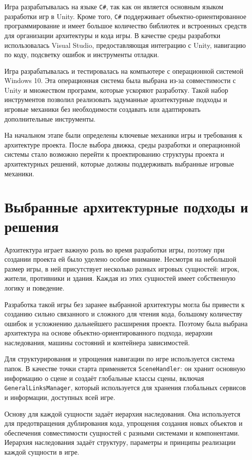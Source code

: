\documentclass[a4paper,12pt]{report}
\begin{document}
Игра разрабатывалась на языке \texttt{C\#}, так как он является основным языком разработки игр в Unity. Кроме того, \texttt{C\#} поддерживает объектно-ориентированное программирование и имеет большое количество библиотек и встроенных средств для организации архитектуры и кода игры. В качестве среды разработки использовалась Visual Studio, предоставляющая интеграцию с Unity, навигацию по коду, подсветку ошибок и инструменты отладки.

Игра разрабатывалась и тестировалась на компьютере с операционной системой Windows 10. Эта операционная система была выбрана из-за совместимости с Unity и множеством программ, которые ускоряют разработку. Такой набор инструментов позволил реализовать задуманные архитектурные подходы и игровые механики без необходимости создавать или адаптировать дополнительные инструменты.

На начальном этапе были определены ключевые механики игры и требования к архитектуре проекта. После выбора движка, среды разработки и операционной системы стало возможно перейти к проектированию структуры проекта и архитектурных решений, которые должны поддерживать выбранные игровые механики.

\section{Выбранные архитектурные подходы и решения}

Архитектура играет важную роль во время разработки игры, поэтому при создании проекта ей было уделено особое внимание. Несмотря на небольшой размер игры, в ней присутствует несколько разных игровых сущностей: игрок, жители, противники и здания. Каждая из этих сущностей имеет собственную логику и поведение.

Разработка такой игры без заранее выбранной архитектуры могла бы привести к созданию сильно связанного и сложного для чтения кода, большому количеству ошибок и усложнению дальнейшего расширения проекта. Поэтому была выбрана архитектура на основе объектно-ориентированного подхода, иерархии наследования, машины состояний и контейнера зависимостей.

Для структурирования и упрощения навигации по игре используется система папок. В качестве точки старта применяется \texttt{SceneHandler}: он хранит основную информацию о сцене и создаёт глобальные классы сцены, включая \texttt{GeneralLinksManager}, который используется для хранения глобальных сервисов и информации, доступных всей игре.

Основу для каждой сущности задаёт иерархия наследования. Она используется для предотвращения дублирования кода, упрощения создания новых объектов и обеспечения совместимости сущностей с разными системами и компонентами. Иерархия наследования задаёт структуру, параметры и принципы реализации каждой сущности в игре.
\end{document}
